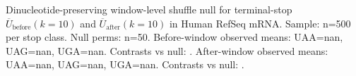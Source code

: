 Dinucleotide-preserving window-level shuffle null for terminal-stop $\overline{U}_{\mathrm{before}}(k=10)$ and $\overline{U}_{\mathrm{after}}(k=10)$ in Human RefSeq mRNA. Sample: n=500 per stop class. Null perms: n=50.
 Before-window observed means: UAA=nan, UAG=nan, UGA=nan.
 Contrasts vs null: .
 After-window observed means: UAA=nan, UAG=nan, UGA=nan.
 Contrasts vs null: .
